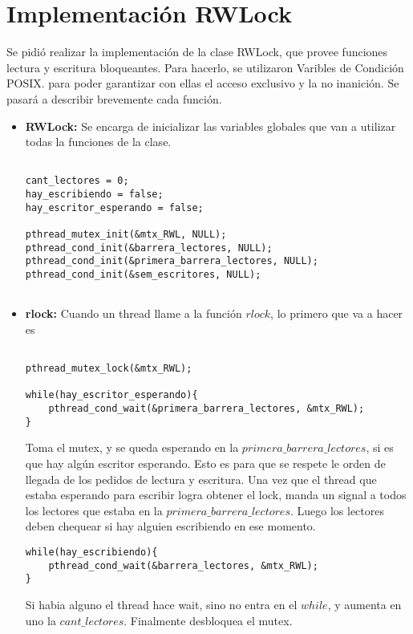 \section{Implementación RWLock}
Se pidió realizar la implementación de la clase RWLock, que provee funciones lectura y escritura bloqueantes. 
Para hacerlo, se utilizaron Varibles de Condición POSIX. para poder garantizar con ellas el acceso exclusivo y la no inanición.
Se pasará a describir brevemente cada función.
\begin{itemize}
\item{\textbf{RWLock: }Se encarga de inicializar las variables globales que van a utilizar todas la funciones de la clase.}

\begin{lstlisting}

cant_lectores = 0;
hay_escribiendo = false;
hay_escritor_esperando = false;
    
pthread_mutex_init(&mtx_RWL, NULL);
pthread_cond_init(&barrera_lectores, NULL);		
pthread_cond_init(&primera_barrera_lectores, NULL);		
pthread_cond_init(&sem_escritores, NULL);
	
\end{lstlisting}

\item{\textbf{rlock: }}Cuando un thread llame a la función $rlock$, lo primero que va a hacer es 
\begin{lstlisting}
	
pthread_mutex_lock(&mtx_RWL);
     
while(hay_escritor_esperando){
	pthread_cond_wait(&primera_barrera_lectores, &mtx_RWL);
}
\end{lstlisting}
Toma el mutex, y se queda esperando en la $primera\_barrera\_lectores$, si es que hay algún escritor esperando. Esto es para que se respete le orden 
de llegada de los pedidos de lectura y escritura. Una vez que el thread que estaba esperando para escribir logra obtener el lock, manda un signal a todos
los lectores que estaba en la $primera\_barrera\_lectores$.
Luego los lectores deben chequear si hay alguien escribiendo en ese momento.
\begin{lstlisting}
while(hay_escribiendo){
	pthread_cond_wait(&barrera_lectores, &mtx_RWL);
}	
\end{lstlisting}
Si habia alguno el thread hace wait, sino no entra en el $while$, y aumenta en uno la $cant\_lectores$. Finalmente desbloquea el mutex.


\end{itemize}
